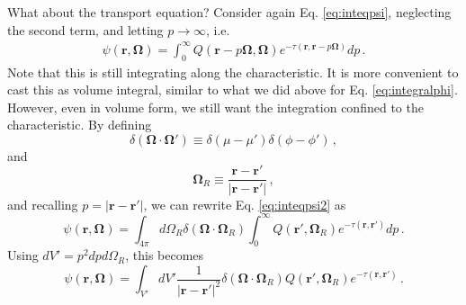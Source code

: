 What about the transport equation?  Consider again Eq. \ref{eq:inteqpsi}, neglecting the second term, and letting $p\to \infty$, i.e. 
\begin{equation}
  \begin{split}
    \psi(\mathbf{r},\mathbf{\Omega}) = \int^{\infty}_0 Q(\mathbf{r} -p\mathbf{\Omega},\mathbf{\Omega})e^{-\tau(\mathbf{r},\mathbf{r}-p\mathbf{\Omega})}dp                          \, .
  \end{split}
  \label{eq:inteqpsi2}
\end{equation}
Note that this is still integrating along the characteristic.  It is more convenient to cast this as volume integral, similar to what we did above for Eq. \ref{eq:integralphi}.  However, even in volume form, we still want the integration confined to the characteristic.  By defining
\begin{equation}
 \delta(\mathbf{\Omega}\cdot\mathbf{\Omega}') \equiv \delta(\mu-\mu')\delta(\phi-\phi') \, ,
\end{equation}
and
\begin{equation}
 \mathbf{\Omega}_R \equiv \frac{\mathbf{r} -\mathbf{r}'}{|\mathbf{r}-\mathbf{r}'|} \, ,
\end{equation}
and recalling $p = |\mathbf{r}-\mathbf{r}'|$, we can rewrite Eq. \ref{eq:inteqpsi2} as
\begin{equation}
    \psi(\mathbf{r},\mathbf{\Omega}) = \int_{4\pi} d\Omega_R \delta(\mathbf{\Omega}\cdot\mathbf{\Omega}_R) \int^{\infty}_0 Q(\mathbf{r}',\mathbf{\Omega}_R)e^{-\tau(\mathbf{r},\mathbf{r'})}dp                          \, .
\end{equation}
Using $dV' = p^2dpd\Omega_R$, this becomes
\begin{equation}
    \psi(\mathbf{r},\mathbf{\Omega}) = \int_{V'} dV' \frac{1}{|\mathbf{r}-\mathbf{r}'|^2} \delta(\mathbf{\Omega}\cdot\mathbf{\Omega}_R)  Q(\mathbf{r}',\mathbf{\Omega}_R)e^{-\tau(\mathbf{r},\mathbf{r'})}                          \, .
\end{equation}

